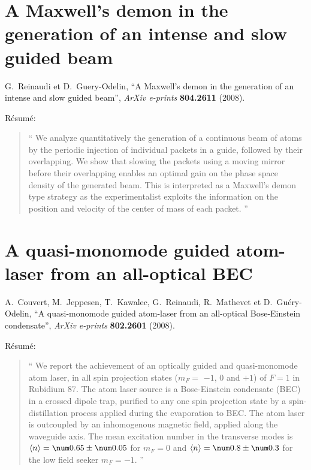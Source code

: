 \section{A Maxwell's demon in the generation of an intense and slow guided beam}
\noindent
{\sc G.~{Reinaudi}} et {\sc D.~{Guery-Odelin}}, \enquote{{A Maxwell's demon in
  the generation of an intense and slow guided beam}}, {\em ArXiv e-prints\/}
  {\bf 804.2611} (2008).

\vspace{1ex}
Résumé:
\begin{quote}\enquote{
We analyze quantitatively the generation of a continuous beam of atoms by the periodic injection of individual packets in a guide, followed by their overlapping. We show that slowing the packets using a moving mirror before their overlapping enables an optimal gain on the phase space density of the generated beam. This is interpreted as a Maxwell's demon type strategy as the experimentalist exploits the information on the position and velocity of the center of mass of each packet.%
}\end{quote}

\section{A quasi-monomode guided atom-laser from an all-optical BEC}
\noindent
{\sc A.~{Couvert}}, {\sc M.~{Jeppesen}}, {\sc T.~{Kawalec}}, {\sc
  G.~{Reinaudi}}, {\sc R.~{Mathevet}} et {\sc D.~{Guéry-Odelin}}, \enquote{{A
  quasi-monomode guided atom-laser from an all-optical Bose-Einstein
  condensate}}, {\em ArXiv e-prints\/} {\bf 802.2601} (2008).

\vspace{1ex}
Résumé:
\begin{quote}\enquote{
We report the achievement of an optically guided and quasi-monomode atom laser, in all spin projection states ($m_F =$ $-1$, $0$ and $+1$) of $F=1$ in Rubidium 87. The atom laser source is a Bose-Einstein condensate (BEC) in a crossed dipole trap, purified to any one spin projection state by a spin-distillation process applied during the evaporation to BEC. The atom laser is outcoupled by an inhomogenous magnetic field, applied along the waveguide axis. The mean excitation number in the transverse modes is $\langle n \rangle = \valpm{0.65}{0.05}$ for $m_F = 0 $ and $ \langle n \rangle = \valpm{0.8}{0.3}$ for the low field seeker $m_F = -1$.%
}\end{quote}

